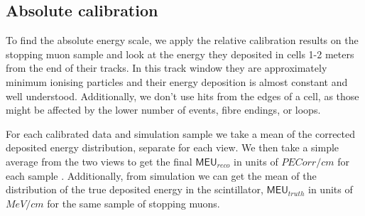 \documentclass[12pt,a4paper]{article}
\begin{document}


\subsection{Absolute calibration}

To find the absolute energy scale, we apply the relative calibration results on the stopping muon sample and look at the energy they deposited in cells 1-2 meters from the end of their tracks. In this track window they are approximately minimum ionising particles and their energy deposition is almost constant and well understood. Additionally, we don't use hits from the edges of a cell, as those might be affected by the lower number of events, fibre endings, or loops. 

For each calibrated data and simulation sample we take a mean of the corrected deposited energy distribution, separate for each view. We then take a simple average from the two views to get the final $\textsf{MEU}_{reco}$ in units of $\unit{PECorr/cm}$ for each sample \cite{NOVA-doc-13579-FACalorimetricEnergyScale}. Additionally, from simulation we can get the mean of the distribution of the true deposited energy in the scintillator, $\textsf{MEU}_{truth}$ in units of $\unit{MeV/cm}$ for the same sample of stopping muons. 
\end{document}
